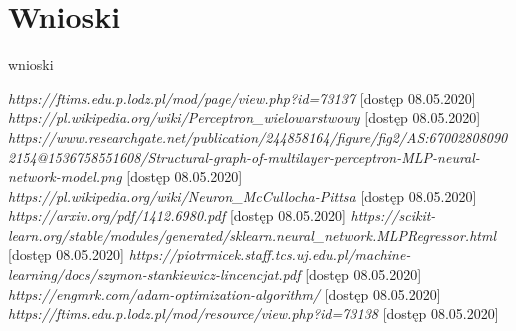 \documentclass{classrep}
\begin{document}
\section{Wnioski} %
wnioski
\begin{thebibliography}{0}
  	 \textsl{https://ftims.edu.p.lodz.pl/mod/page/view.php?id=73137} [dostęp 08.05.2020]
	 \textsl{https://pl.wikipedia.org/wiki/Perceptron\_wielowarstwowy} [dostęp 08.05.2020]
	 \textsl{https://www.researchgate.net/publication/244858164/figure/fig2/AS:670028080902154@1536758551608/Structural-graph-of-multilayer-perceptron-MLP-neural-network-model.png} [dostęp 08.05.2020]
	 \textsl{https://pl.wikipedia.org/wiki/Neuron\_McCullocha-Pittsa} [dostęp 08.05.2020]
	 \textsl{https://arxiv.org/pdf/1412.6980.pdf} [dostęp 08.05.2020]
	 \textsl{https://scikit-learn.org/stable/modules/generated/sklearn.neural\_network.MLPRegressor.html} [dostęp 08.05.2020]
	 \textsl{https://piotrmicek.staff.tcs.uj.edu.pl/machine-learning/docs/szymon-stankiewicz-lincencjat.pdf} [dostęp 08.05.2020]
	 \textsl{https://engmrk.com/adam-optimization-algorithm/} [dostęp 08.05.2020]
	 \textsl{https://ftims.edu.p.lodz.pl/mod/resource/view.php?id=73138} [dostęp 08.05.2020]
\end{thebibliography}
\end{document}
